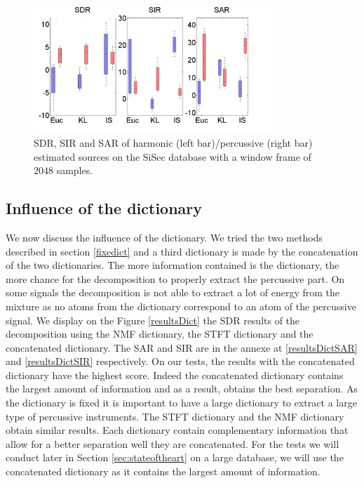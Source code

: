 \documentclass[journal]{IEEEtran}
\begin{document}
\begin{figure}[htb]

  \centering 
  \includegraphics[width=9cm]{fig/DivergenceFrame2048.png}
  \caption{\label{frame2048} SDR, SIR and SAR of harmonic (left bar)/percussive (right bar) estimated sources on the SiSec database with a window frame of $2048$ samples.}
  
\end{figure}



\subsection{Influence of the dictionary}\label{setup:dictionary}

We now discuss the influence of the dictionary. We tried the two methods described in section \ref{fixedict} and a third dictionary is made by the concatenation of the two dictionaries. The more information contained is the dictionary, the more chance for the decomposition to properly extract the percussive part. On some signals the decomposition is not able to extract a lot of energy from the mixture as no atoms from the dictionary correspond to an atom of the percussive signal.
We display on the Figure \ref{resultsDict} the SDR results of the decomposition using the NMF dictionary, the STFT dictionary and the concatenated dictionary. The SAR and SIR are in the annexe at \ref{resultsDictSAR} and \ref{resultsDictSIR} respectively. On our tests, the results with the concatenated dictionary have the highest score. Indeed the concatenated dictionary contains the largest amount of information and as a result, obtains the best separation. As the dictionary is fixed it is important to have a large dictionary to extract a large type of percussive instruments. The STFT dictionary and the NMF dictionary obtain similar results. Each dictionary contain complementary information that allow for a better separation well they are concatenated. For the tests we will conduct later in Section \ref{sec:stateoftheart} on a large database, we will use the concatenated dictionary as it contains the largest amount of information. 
\end{document}
